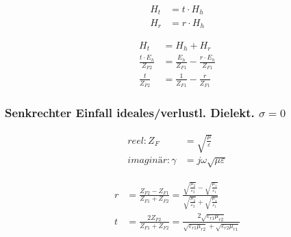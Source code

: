 \begin{align*}
    H_t & = t \cdot H_h \\
    H_r & = r \cdot H_h
\end{align*}

\begin{align*}
    H_t                         & = H_h + H_r                                          \\
    \frac{t\cdot E_{h}}{Z_{F2}} & = \frac{E_{h}}{Z_{F1}} - \frac{r\cdot E_{h}}{Z_{F1}} \\
    \frac{t}{Z_{F2}}            & = \frac{1}{Z_{F1}} - \frac{r}{Z_{F1}}
\end{align*}




\subsubsection{Senkrechter Einfall ideales/verlustl. Dielekt. $\sigma = 0$}


\begin{align*}
    reel: Z_F        & = \sqrt{\frac{\mu}{\varepsilon}}   \\
    imaginär: \gamma & = j \omega \sqrt{ \mu \varepsilon}
\end{align*}

\begin{align*}
    r & = \frac{Z_{F2} - Z_{F1}}{Z_{F1} + Z_{F2}} = \frac{\sqrt{\frac{\mu_2}{\varepsilon_2}} - \sqrt{\frac{\mu_1}{\varepsilon_1}}}{\sqrt{\frac{\mu_2}{\varepsilon_2}} + \sqrt{\frac{\mu_1}{\varepsilon_1}}} \\
    t & = \frac{2 Z_{F2}}{Z_{F1} + Z_{F2}} = \frac{2\sqrt{\varepsilon_{r1}\mu_{r2}}}{\sqrt{\varepsilon_{r1}\mu_{r2}}+\sqrt{\varepsilon_{r2}\mu_{r1}}}
\end{align*}


